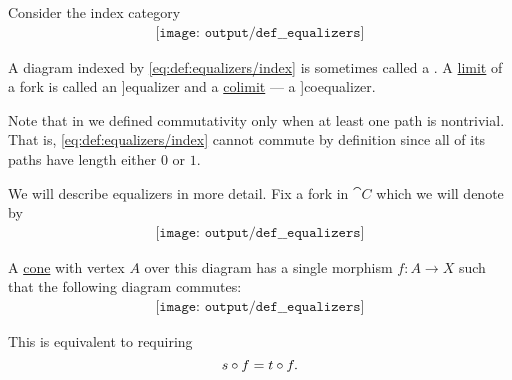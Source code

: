 \begin{definition}\label{def:equalizers}
  Consider the index category
  \begin{equation}\label{eq:def:equalizers/index}
    \begin{aligned}
      \texttt{[image: output/def\_\_equalizers]}
    \end{aligned}
  \end{equation}

  A diagram indexed by \eqref{eq:def:equalizers/index} is sometimes called a . A \hyperref[def:category_of_cones/limit]{limit} of a fork is called an \term[ru=уравнитель \cite[36]{ЦаленкоШульгейфер1974Категории}]{equalizer} and a \hyperref[def:category_of_cones/colimit]{colimit} --- a \term[ru=коуравнитель \cite[37]{ЦаленкоШульгейфер1974Категории}]{coequalizer}.

  Note that in  we defined commutativity only when at least one path is nontrivial. That is, \eqref{eq:def:equalizers/index} cannot commute by definition since all of its paths have length either \( 0 \) or \( 1 \).

  We will describe equalizers in more detail. Fix a fork in \( \cat{C} \) which we will denote by
  \begin{equation}\label{eq:def:equalizers/raw_diagram}
    \begin{aligned}
      \texttt{[image: output/def\_\_equalizers]}
    \end{aligned}
  \end{equation}

  \begin{minipage}[t]{0.47\textwidth}
    A \hyperref[def:category_of_cones/cone]{cone} with vertex \( A \) over this diagram has a single morphism \( f: A \to X \) such that the following diagram commutes:
    \begin{equation}\label{eq:def:equalizers/cone}
      \begin{aligned}
        \texttt{[image: output/def\_\_equalizers]}
      \end{aligned}
    \end{equation}

    This is equivalent to requiring
    \begin{equation*}
      s \bincirc f = t \bincirc f.
    \end{equation*}


\end{minipage}
\end{definition}
